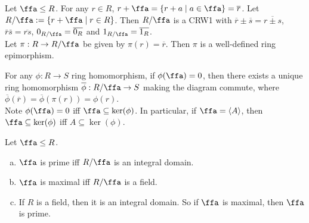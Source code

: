 \begin{construction}
    Let $\ffa \leq R$. For any $r \in R$, $r+\ffa = \{r + a \mid a \in \ffa\} = \overline r$. Let $R/\ffa := \{r + \ffa \mid r \in R\}$. Then $R/\ffa$ is a CRW1 with $\overline r \pm \overline s = \overline {r \pm s}$, $\bar r \bar s = \overline{rs}$, $0_{R/\ffa} = \overline {0_R}$ and $1_{R/\ffa} = \overline {1_R}$. \\
    Let $\pi: R \to R/\ffa$ be given by $\pi(r) = \overline r$. Then $\pi$ is a well-defined ring epimorphism.
    \begin{center}
    \end{center}
    For any $\phi: R \to S$ ring homomorphism, if $\phi(\ffa) = 0$, then there exists a unique ring homomorphism $\overline \phi: R/\ffa \to S$ making the diagram commute, where $\overline \phi(\overline r) = \overline \phi (\pi(r)) = \phi(r)$. \\
    Note $\phi(\ffa) = 0$ iff $\ffa \subseteq \ker(\phi)$. In particular, if $\ffa = \langle A \rangle$, then $\ffa \subseteq \ker(\phi)$ iff $A \subseteq \ker(\phi)$.
\end{construction}

\begin{fact}
    Let $\ffa \leq R$. 
    \begin{enumerate}[(a)]
        \item $\ffa$ is prime iff $R/\ffa$ is an integral domain.
        \item $\ffa$ is maximal iff $R/\ffa$ is a field.
        \item If $R$ is a field, then it is an integral domain. So if $\ffa$ is maximal, then $\ffa$ is prime.
    \end{enumerate}
\end{fact}

